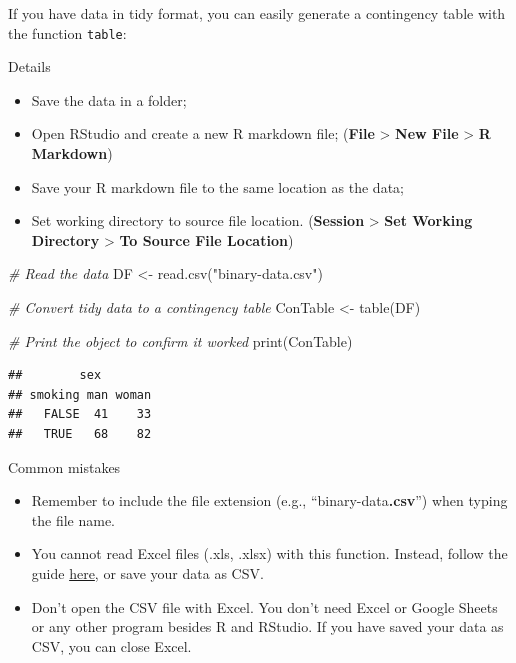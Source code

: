 \documentclass[
]{book}
\newenvironment{Shaded}{\begin{snugshade}}{\end{snugshade}}
\newcommand{\CommentTok}[1]{\textcolor[rgb]{0.56,0.35,0.01}{\textit{#1}}}
\newcommand{\FunctionTok}[1]{\textcolor[rgb]{0.00,0.00,0.00}{#1}}
\newcommand{\NormalTok}[1]{#1}
\newcommand{\OtherTok}[1]{\textcolor[rgb]{0.56,0.35,0.01}{#1}}
\newcommand{\StringTok}[1]{\textcolor[rgb]{0.31,0.60,0.02}{#1}}
\providecommand{\tightlist}{%
  \setlength{\itemsep}{0pt}\setlength{\parskip}{0pt}}
\begin{document}
If you have data in tidy format, you can easily generate a contingency table with the function \texttt{table}:

Details

\begin{itemize}
\tightlist
\item
  Save the data in a folder;
\item
  Open RStudio and create a new R markdown file; (\textbf{File} \textgreater{} \textbf{New File} \textgreater{} \textbf{R Markdown})
\item
  Save your R markdown file to the same location as the data;
\item
  Set working directory to source file location. (\textbf{Session} \textgreater{} \textbf{Set Working Directory} \textgreater{} \textbf{To Source File Location})
\end{itemize}

\begin{Shaded}
\begin{Highlighting}[]
\CommentTok{\# Read the data}
\NormalTok{DF }\OtherTok{\textless{}{-}} \FunctionTok{read.csv}\NormalTok{(}\StringTok{"binary{-}data.csv"}\NormalTok{)}

\CommentTok{\# Convert tidy data to a contingency table}
\NormalTok{ConTable }\OtherTok{\textless{}{-}} \FunctionTok{table}\NormalTok{(DF)}

\CommentTok{\# Print the object to confirm it worked}
\FunctionTok{print}\NormalTok{(ConTable)}
\end{Highlighting}
\end{Shaded}

\begin{verbatim}
##        sex
## smoking man woman
##   FALSE  41    33
##   TRUE   68    82
\end{verbatim}

Common mistakes

\begin{itemize}
\tightlist
\item
  Remember to include the file extension (e.g., ``binary-data\textbf{.csv}'') when typing the file name.
\item
  You cannot read Excel files (.xls, .xlsx) with this function. Instead, follow the guide \protect\hyperlink{read}{here}, or save your data as CSV.
\item
  Don't open the CSV file with Excel. You don't need Excel or Google Sheets or any other program besides R and RStudio. If you have saved your data as CSV, you can close Excel.
\end{itemize}
\end{document}
